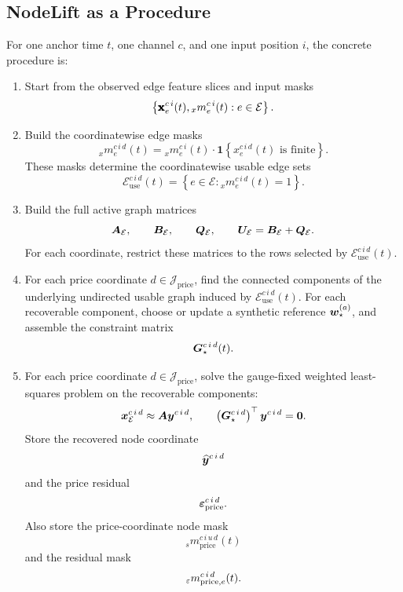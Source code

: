 \subsection{NodeLift as a Procedure}
\label{subsec:nodelift-procedure}

For one anchor time $t$, one channel $c$, and one input position $i$, the
concrete procedure is:

\begin{enumerate}
  \item Start from the observed edge feature slices and input masks
  \[
    \left\{
      \pmb{\mathbf{x}}_{e}^{c\,i}(t),
      {}_{x}m_{e}^{c\,i}(t)
      :
      e\in\mathcal{E}
    \right\}.
  \]

  \item Build the coordinatewise edge masks
  \[
    {}_{x}m_{e}^{c\,i\,d}(t)
    =
    {}_{x}m_{e}^{c\,i}(t)
    \cdot
    \mathbf{1}
    \left\{
      x_{e}^{c\,i\,d}(t)
      \text{ is finite}
    \right\}.
  \]
  These masks determine the coordinatewise usable edge sets
  \[
    \mathcal{E}_{\mathrm{use}}^{c\,i\,d}(t)
    =
    \left\{
      e\in\mathcal{E}:
      {}_{x}m_{e}^{c\,i\,d}(t)=1
    \right\}.
  \]

  \item Build the full active graph matrices
  \[
    \bm{A}_{\mathcal{E}},
    \qquad
    \bm{B}_{\mathcal{E}},
    \qquad
    \bm{Q}_{\mathcal{E}},
    \qquad
    \bm{U}_{\mathcal{E}}
    =
    \bm{B}_{\mathcal{E}}
    +
    \bm{Q}_{\mathcal{E}}.
  \]
  For each coordinate, restrict these matrices to the rows selected by
  $\mathcal{E}_{\mathrm{use}}^{c\,i\,d}(t)$.

  \item For each price coordinate
  $d\in\mathcal{J}_{\mathrm{price}}$, find the connected components of the
  underlying undirected usable graph induced by
  $\mathcal{E}_{\mathrm{use}}^{c\,i\,d}(t)$.  For each recoverable component,
  choose or update a synthetic reference
  $\bm{w}_{\star}^{(a)}$, and assemble the constraint matrix
  \[
    \bm{G}_{\star}^{c\,i\,d}(t).
  \]

  \item For each price coordinate
  $d\in\mathcal{J}_{\mathrm{price}}$, solve the gauge-fixed weighted
  least-squares problem on the recoverable components:
  \[
    \bm{x}_{\mathcal{E}}^{c\,i\,d}
    \approx
    \bm{A}\bm{y}^{c\,i\,d},
    \qquad
    \left(
      \bm{G}_{\star}^{c\,i\,d}
    \right)^{\top}
    \bm{y}^{c\,i\,d}
    =
    \bm{0}.
  \]
  Store the recovered node coordinate
  \[
    \widehat{\bm{y}}^{c\,i\,d}
  \]
  and the price residual
  \[
    \bm{\varepsilon}_{\mathrm{price}}^{c\,i\,d}.
  \]
  Also store the price-coordinate node mask
  \[
    {}_{s}m_{\mathrm{price}}^{c\,i\,u\,d}(t)
  \]
  and the residual mask
  \[
    {}_{\varepsilon}m_{\mathrm{price},e}^{c\,i\,d}(t).
  \]


\end{enumerate}
